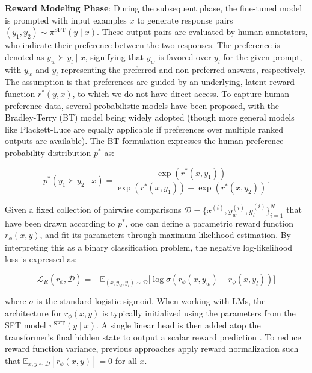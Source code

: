 \textbf{Reward Modeling Phase}: During the subsequent phase, the fine-tuned model is prompted with input examples $x$ to generate response pairs $(y_1, y_2)\sim \pi^\text{SFT}(y \mid x)$. These output pairs are evaluated by human annotators, who indicate their preference between the two responses. The preference is denoted as $y_w\succ y_l \mid x$, signifying that $y_w$ is favored over $y_l$ for the given prompt, with $y_w$ and $y_l$ representing the preferred and non-preferred answers, respectively. The assumption is that preferences are guided by an underlying, latent reward function $r^*(y, x)$, to which we do not have direct access. To capture human preference data, several probabilistic models have been proposed, with the Bradley-Terry (BT) model \cite{bradley1952rankanalysis} being widely adopted (though more general models like Plackett-Luce \citep{plackett1975analysis, luce2012individual} are equally applicable if preferences over multiple ranked outputs are available). The BT formulation expresses the human preference probability distribution $p^*$ as:

\begin{equation}\label{eq:bradley-terry}
    p^*(y_1\succ y_2 \mid x)=\frac{\exp\left(r^*(x, y_1)\right)}{\exp\left(r^*(x, y_1)\right) + \exp\left(r^*(x, y_2)\right)}.
\end{equation}

Given a fixed collection of pairwise comparisons $\mathcal{D}=\bigl\{x^{(i)}, y_w^{(i)}, y_l^{(i)}\bigr\}_{i=1}^N$ that have been drawn according to $p^*$, one can define a parametric reward function $r_{\phi}(x, y)$, and fit its parameters through maximum likelihood estimation. By interpreting this as a binary classification problem, the negative log-likelihood loss is expressed as:

\begin{equation}\label{eq:reward_model}
    \mathcal{L}_R(r_{\phi}, \mathcal{D}) = -\mathbb{E}_{(x, y_w, y_l)\sim \mathcal{D}}\bigl[\log \sigma(r_{\phi}(x, y_w)- r_{\phi}(x, y_l))\bigr]
\end{equation}

where $\sigma$ is the standard logistic sigmoid. When working with LMs, the architecture for $r_{\phi}(x, y)$ is typically initialized using the parameters from the SFT model $\pi^\text{SFT}(y \mid x)$. A single linear head is then added atop the transformer’s final hidden state to output a scalar reward prediction \cite{ziegler2020finetuning}. To reduce reward function variance, previous approaches apply reward normalization such that  $\mathbb{E}_{x,y\sim \mathcal{D}}\left[r_\phi(x, y)\right] = 0$ for all $x$.

